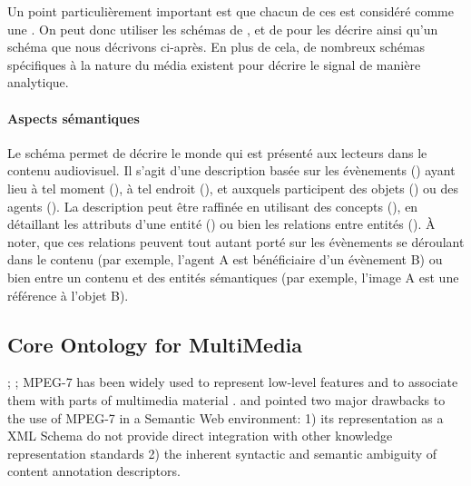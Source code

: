 Un point particulièrement important est que chacun de ces  est considéré comme une . 
On peut donc utiliser les schémas de ,  et de  pour les décrire ainsi qu'un schéma  que nous décrivons ci-après. 
En plus de cela, de nombreux schémas spécifiques à la nature du média existent pour décrire le signal de manière analytique. 


\paragraph{Aspects sémantiques}
Le schéma  permet de décrire le monde qui est présenté aux lecteurs dans le contenu audiovisuel. 
Il s'agit d'une description basée sur les évènements () ayant lieu à tel moment (), à tel endroit (), et auxquels participent des objets () ou des agents (). 
La description peut être raffinée en utilisant des concepts (), en détaillant les attributs d'une entité () ou bien les relations entre entités ().
À noter, que ces relations peuvent tout autant porté sur les évènements se déroulant dans le contenu (par exemple, l'agent A est bénéficiaire d'un évènement B) ou bien entre un contenu et des entités sémantiques (par exemple, l'image A est une référence à l'objet B).







\subsection{Core Ontology for MultiMedia}
\cite{Arndt2009} ; \cite{Arndt2007} ; \cite{Staab2008} 
MPEG-7 has been widely used to represent low-level features and to associate them with parts of multimedia material \cite{VanOssenbruggen2004}. \cite{Nack2005a} and \cite{Arndt2009} pointed two major drawbacks to the use of MPEG-7 in a Semantic Web environment: 1) its representation as a XML Schema do not provide direct integration with other knowledge representation standards 2) the inherent syntactic and semantic ambiguity of content annotation descriptors. 

